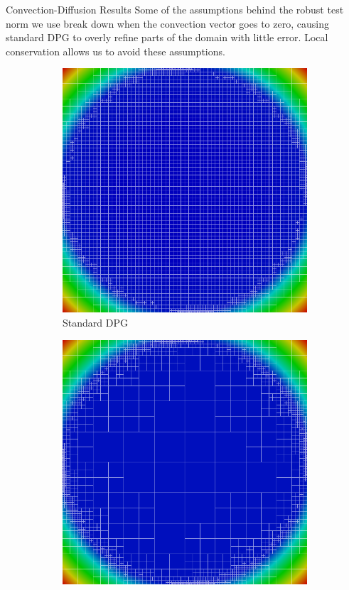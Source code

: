 \documentclass[final]{beamer}
\newlength{\onecolwid}
\begin{document}
\begin{frame}[t]
\begin{columns}[t]
\begin{column}{\onecolwid}
\begin{block}{Convection-Diffusion Results}
\vspace{3ex}
Some of the assumptions behind the robust test norm we use break
down when the convection vector goes to zero, causing standard DPG to overly
refine parts of the domain with little error. Local conservation allows us to
avoid these assumptions.
\begin{figure}
\centering
\begin{subfigure}[t]{0.49\textwidth}
\centering
\includegraphics[width=1.0\textwidth]{figs/Vortex/modified6nc.png}
\caption*{\footnotesize{Standard DPG}}
\end{subfigure}
\begin{subfigure}[t]{0.49\textwidth}
\centering
\includegraphics[width=1.0\textwidth]{figs/Vortex/modified6c.png}

\end{subfigure}
\end{figure}
\end{block}
\end{column}
\end{columns}
\end{frame}
\end{document}
